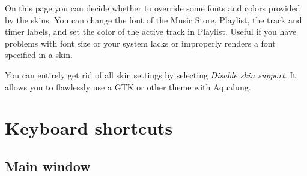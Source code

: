 \documentclass[10pt,english]{article}
\begin{document}
\noindent On this page you can decide whether to override some fonts
and colors provided by the skins. You can change the font of
the Music Store, Playlist, the track and timer labels, and set
the color of the active track in Playlist. Useful if you have
problems with font size or your system lacks or improperly
renders a font specified in a skin.




You can entirely get rid of all skin settings by selecting
\textsl{Disable skin support}. It allows you to flawlessly
use a GTK or other theme with Aqualung.






\section{Keyboard shortcuts\label{idp1867504}}

\subsection{Main window\label{idp1868032}}
\end{document}

